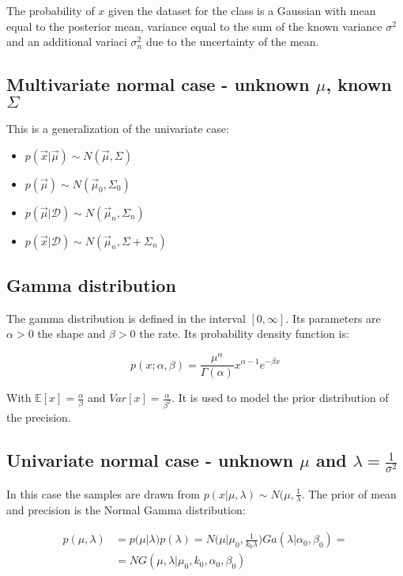 		The probability of $x$ given the dataset for the class is a Gaussian with mean equal to the posterior mean, variance equal to the sum of the known variance $\sigma^2$ and an additional variaci $\sigma^2_n$ due to the uncertainty of the mean.

	\subsection{Multivariate normal case - unknown $\mu$, known $\Sigma$}
	This is a generalization of the univariate case:

	\begin{multicols}{2}
		\begin{itemize}
			\item $p(\vec{x}|\vec{\mu}) \sim N(\vec{\mu}, \Sigma)$
			\item $p(\vec{\mu})\sim N(\vec{\mu}_0, \Sigma_0)$
			\item $p(\vec{\mu}|\mathcal{D}) \sim N(\vec{\mu}_n, \Sigma_n)$
			\item $p(\vec{x}|\mathcal{D}) \sim N(\vec{\mu}_n, \Sigma+\Sigma_n)$
		\end{itemize}
	\end{multicols}

	\subsection{Gamma distribution}
	The gamma distribution is defined in the interval $[0, \infty]$.
	Its parameters are $\alpha>0$ the shape and $\beta>0$ the rate.
	Its probability density function is:

	$$p(x;\alpha, \beta) = \frac{\mu^\alpha}{\Gamma(\alpha)}x^{\alpha-1}e^{-\beta x}$$

	With $\mathbb{E}[x] = \frac{\alpha}{\beta}$ and $Var[x] = \frac{\alpha}{\beta^2}$.
	It is used to model the prior distribution of the precision.

	\subsection{Univariate normal case - unknown $\mu$ and $\lambda = \frac{1}{\sigma^2}$}
	In this case the samples are drawn from $p(x|\mu, \lambda)\sim N(\mu, \frac{1}{\lambda}$.
	The prior of mean and precision is the Normal Gamma distribution:

	\begin{align*}
		p(\mu, \lambda) &=p(\mu|\lambda)p(\lambda) = N\biggl(\mu|\mu_0, \frac{1}{k_0 \lambda}\biggr)Ga(\lambda|\alpha_0, \beta_0)=\\
										&=NG(\mu, \lambda|\mu_0, k_0, \alpha_0, \beta_0)
	\end{align*}

